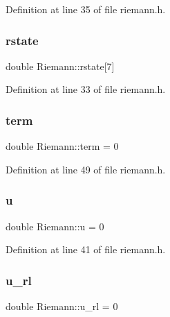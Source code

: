 Definition at line 35 of file riemann.\+h.

\mbox{\label{classRiemann_a46044bb74c7273a552a16425b1ae4cb3}} 
\subsubsection{\texorpdfstring{rstate}{rstate}}
{\footnotesize\ttfamily double Riemann\+::rstate\mbox{[}7\mbox{]}\hspace{0.3cm}{\ttfamily [private]}}



Definition at line 33 of file riemann.\+h.

\mbox{\label{classRiemann_a70786d482bb4e5a4643411cd256c8bc9}} 
\subsubsection{\texorpdfstring{term}{term}}
{\footnotesize\ttfamily double Riemann\+::term = 0\hspace{0.3cm}{\ttfamily [private]}}



Definition at line 49 of file riemann.\+h.

\mbox{\label{classRiemann_a5c0e2b1271b3274db9fe756480cc4013}} 
\subsubsection{\texorpdfstring{u}{u}}
{\footnotesize\ttfamily double Riemann\+::u = 0\hspace{0.3cm}{\ttfamily [private]}}



Definition at line 41 of file riemann.\+h.

\mbox{\label{classRiemann_a44cf94d6988534e5e05bf34b52800553}} 
\subsubsection{\texorpdfstring{u\+\_\+rl}{u\_rl}}
{\footnotesize\ttfamily double Riemann\+::u\+\_\+rl = 0\hspace{0.3cm}{\ttfamily [private]}}



